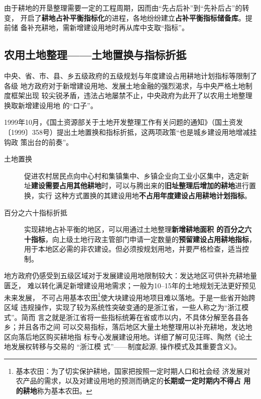 
由于耕地的开垦整理需要一定的工程周期，因而由“先占后补”到“先补后占”的转变，
开启了\textbf{耕地占补平衡指标化}的进程，各地纷纷建立\textbf{占补平衡指标储备库}。提前储
备补充耕地，需新增建设用地时再从库中支取“指标”。



\subsection{农用土地整理——土地置换与指标折抵}

中央、省、市、县、乡五级政府的五级规划与年度建设占用耕地计划指标等限制了各级
地方政府对于新增建设用地、发展土地金融的强烈渴求，与中央严格土地制度框架出现
较尖锐矛盾，违法占地屡禁不止，中央政府为此开了以农用土地整理换取新增建设用地
的“口子”。

1999年10月，《国土资源部关于土地开发整理工作有关问题的通知》（国土资发
〔1999〕358号）提出土地置换和指标折抵，这两项政策“也是城乡建设用地增减挂钩政
策出台的前奏”。

\begin{description}
\item[土地置换] 促进农村居民点向中心村和集镇集中、乡镇企业向工业小区集中，选定新
  址\textbf{建设需要占用其他耕地}时，可以与腾出来的\textbf{旧址整理后增加的耕地}进行置换，实行
  这种方式置换的其建设用地\textbf{不占用年度建设占用耕地计划指标}。


\item[百分之六十指标折抵] 实现耕地占补平衡的地区，可以用通过土地整理\textbf{新增耕地面积
  的百分之六十指标}，向上级土地行政主管部门申请一定数量的\textbf{预留建设占用耕地指标}，
  用于本地区必需的非农建设。但必须按规划用地，并要严格检查，适当控制。
\end{description}

地方政府仍感受到五级区域对于发展建设用地限制较大：发达地区可供补充耕地量匮乏，
难以转化满足新增建设用地需求；一般为10--15年的土地规划无法更好预见未来发展，
不可占用基本农田\footnote{基本农田：为了切实保护耕地，国家把按照一定时期人口和社会经
  济发展对农产品的需求，以及对建设用地的预测而确定的\textbf{长期或一定时期内不得占
    用的耕地}称为基本农田。}使大块建设用地项目难以落地。于是一些省开始跨区域
违规操作，实现了较为系统性突破变通的是浙江省，一些人称之为“浙江模式”。简而
言之就是浙江省将一些指标统筹在省或市以内，不具体分解至各县各乡；并且各市之间
可以交易指标，落后地区大量土地整理用以补充耕地，发达地区向落后地区购买耕地指
标专心发展建设用地。详细了解可见汪晖、陶然《论土地发展权转移与交易的 “浙江模
式”——制度起源, 操作模式及其重要含义》。


